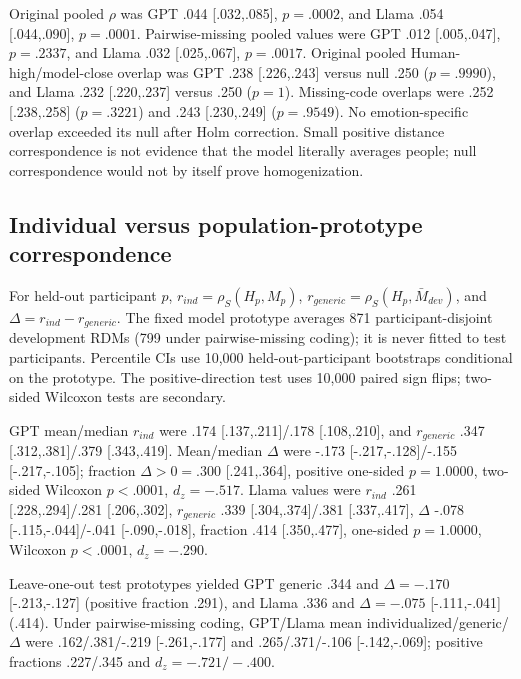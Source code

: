 Original pooled $\rho$ was GPT .044 [.032,.085], $p=.0002$, and Llama .054 [.044,.090], $p=.0001$. Pairwise-missing pooled values were GPT .012 [.005,.047], $p=.2337$, and Llama .032 [.025,.067], $p=.0017$. Original pooled Human-high/model-close overlap was GPT .238 [.226,.243] versus null .250 ($p=.9990$), and Llama .232 [.220,.237] versus .250 ($p=1$). Missing-code overlaps were .252 [.238,.258] ($p=.3221$) and .243 [.230,.249] ($p=.9549$). No emotion-specific overlap exceeded its null after Holm correction. Small positive distance correspondence is not evidence that the model literally averages people; null correspondence would not by itself prove homogenization.

\subsection{Individual versus population-prototype correspondence}
\label{app:individual-prototype}

For held-out participant $p$, $r_{ind}=\rho_S(H_p,M_p)$, $r_{generic}=\rho_S(H_p,\bar M_{dev})$, and $\Delta=r_{ind}-r_{generic}$. The fixed model prototype averages 871 participant-disjoint development RDMs (799 under pairwise-missing coding); it is never fitted to test participants. Percentile CIs use 10,000 held-out-participant bootstraps conditional on the prototype. The positive-direction test uses 10,000 paired sign flips; two-sided Wilcoxon tests are secondary.

GPT mean/median $r_{ind}$ were .174 [.137,.211]/.178 [.108,.210], and $r_{generic}$ .347 [.312,.381]/.379 [.343,.419]. Mean/median $\Delta$ were -.173 [-.217,-.128]/-.155 [-.217,-.105]; fraction $\Delta>0=.300$ [.241,.364], positive one-sided $p=1.0000$, two-sided Wilcoxon $p<.0001$, $d_z=-.517$. Llama values were $r_{ind}$ .261 [.228,.294]/.281 [.206,.302], $r_{generic}$ .339 [.304,.374]/.381 [.337,.417], $\Delta$ -.078 [-.115,-.044]/-.041 [-.090,-.018], fraction .414 [.350,.477], one-sided $p=1.0000$, Wilcoxon $p<.0001$, $d_z=-.290$.

Leave-one-out test prototypes yielded GPT generic .344 and $\Delta=-.170$ [-.213,-.127] (positive fraction .291), and Llama .336 and $\Delta=-.075$ [-.111,-.041] (.414). Under pairwise-missing coding, GPT/Llama mean individualized/generic/$\Delta$ were .162/.381/-.219 [-.261,-.177] and .265/.371/-.106 [-.142,-.069]; positive fractions .227/.345 and $d_z=-.721/-.400$.

